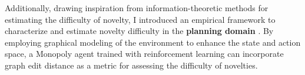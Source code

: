 % 
Additionally, drawing inspiration from information-theoretic methods for estimating the difficulty of novelty, I introduced an empirical framework to characterize and estimate novelty difficulty in the \textbf{planning domain} \cite{solaiman2022measurement}. By employing graphical modeling of the environment to enhance the state and action space, a Monopoly agent trained with reinforcement learning can incorporate graph edit distance as a metric for assessing the difficulty of novelties.